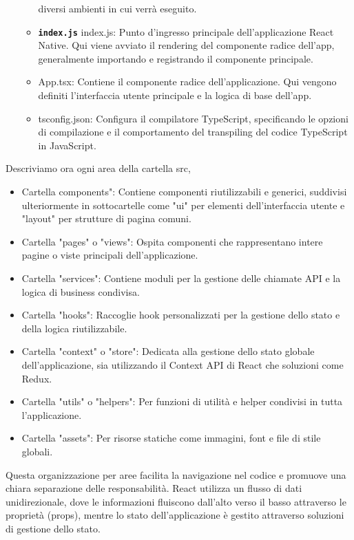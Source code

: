 \begin{itemize}
\begin{itemize}
                  diversi ambienti in cui verrà eseguito.
            \item \textbf{\texttt{index.js}} index.js: Punto d'ingresso principale dell'applicazione React Native. Qui viene 
                  avviato il rendering del componente radice dell'app, generalmente importando e registrando il componente 
                  principale.
            \item App.tsx: Contiene il componente radice dell'applicazione. Qui vengono definiti l'interfaccia utente principale 
                  e la logica di base dell'app.
            \item tsconfig.json: Configura il compilatore TypeScript, specificando le opzioni di compilazione e il comportamento del transpiling del codice TypeScript in JavaScript.
          \end{itemize}
\end{itemize}

Descriviamo ora ogni area della cartella src,
\begin{itemize}
      \item Cartella components": Contiene componenti riutilizzabili e generici, suddivisi ulteriormente in sottocartelle come "ui" per elementi dell'interfaccia utente e "layout" per strutture di pagina comuni.
      \item Cartella "pages" o "views": Ospita componenti che rappresentano intere pagine o viste principali dell'applicazione.
      \item Cartella "services": Contiene moduli per la gestione delle chiamate API e la logica di business condivisa.
      \item Cartella "hooks": Raccoglie hook personalizzati per la gestione dello stato e della logica riutilizzabile.
      \item Cartella "context" o "store": Dedicata alla gestione dello stato globale dell'applicazione, sia utilizzando il Context API di React che soluzioni come Redux.
      \item Cartella "utils" o "helpers": Per funzioni di utilità e helper condivisi in tutta l'applicazione.
      \item Cartella "assets": Per risorse statiche come immagini, font e file di stile globali.
\end{itemize}
Questa organizzazione per aree facilita la navigazione nel codice e promuove una chiara separazione delle responsabilità. 
React utilizza un flusso di dati unidirezionale, dove le informazioni fluiscono dall'alto verso il basso attraverso le 
proprietà (props), mentre lo stato dell'applicazione è gestito attraverso soluzioni di gestione dello stato.
